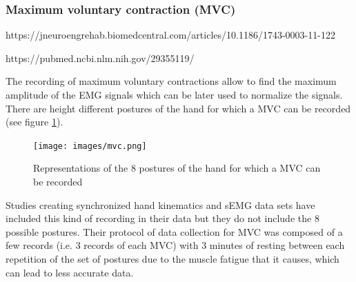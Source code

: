 \subsubsection{Maximum voluntary contraction (MVC)}
https://jneuroengrehab.biomedcentral.com/articles/10.1186/1743-0003-11-122

https://pubmed.ncbi.nlm.nih.gov/29355119/


The recording of maximum voluntary contractions allow to find the maximum amplitude of the EMG signals which can be later used to normalize the signals.
There are height different postures of the hand for which a MVC can be recorded (see figure \ref{fig:mvc}).

\begin{figure}
    \centering
    \texttt{[image: images/mvc.png]}
    \caption{Representations of the 8 postures of the hand for which a MVC can be recorded}
    \label{fig:mvc}
\end{figure}

Studies creating synchronized hand kinematics and sEMG data sets have included this kind of recording in their data \cite{ref:Ngeo2014, ref:KinMusUji} but they do not include the 8 possible postures. Their protocol of data collection for MVC was composed of a few records (i.e. 3 records of each MVC) with 3 minutes of resting between each repetition of the set of postures due to the muscle fatigue that it causes, which can lead to less accurate data.
